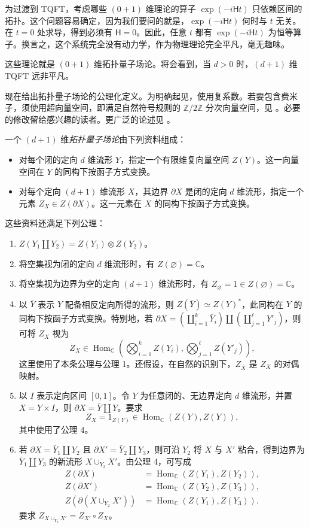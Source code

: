 为过渡到 TQFT，考虑哪些 $(0+1)$ 维理论的算子 $\exp(-i\mathsf Ht)$ 只依赖区间的拓扑。这个问题容易确定，因为我们要问的就是，$\exp(-i\mathsf Ht)$ 何时与 $t$ 无关。在 $t=0$ 处求导，得到必须有 $\mathsf H=0$。因此，任意 $t$ 都有 $\exp(-i\mathsf Ht)$ 为恒等算子。换言之，这个系统完全没有动力学，作为物理理论完全平凡，毫无趣味。

这些理论就是 $(0+1)$ 维拓扑量子场论。将会看到，当 $d>0$ 时，$(d+1)$ 维 TQFT 远非平凡。

现在给出拓扑量子场论的公理化定义。为明确起见，使用复系数。若要包含费米子，须使用超向量空间，即满足自然符号规则的 $\mathbb Z/2\mathbb Z$ 分次向量空间，见 。必要的修改留给感兴趣的读者。更广泛的论述见 。
\begin{definition}\label{def:topological-qft}
一个 $(d+1)$ 维\emph{拓扑量子场论}由下列资料组成：
\begin{itemize}
\item 对每个闭的定向 $d$ 维流形 $Y$，指定一个有限维复向量空间 $Z(Y)$。这一向量空间在 $Y$ 的同构下按函子方式变换。
\item 对每个定向 $(d+1)$ 维流形 $X$，其边界 $\partial X$ 是闭的定向 $d$ 维流形，指定一个元素 $Z_X\in Z(\partial X)$。这一元素在 $X$ 的同构下按函子方式变换。
\end{itemize}
这些资料还满足下列公理：
\begin{enumerate}[label=\textbf{公理 \arabic*：},leftmargin=4.7em]
\item $Z(Y_1\coprod Y_2)=Z(Y_1)\otimes Z(Y_2)$。
\item 将空集视为闭的定向 $d$ 维流形时，有 $Z(\varnothing)=\mathbb C$。
\item 将空集视为边界为空的定向 $(d+1)$ 维流形时，有 $Z_{\varnothing}=1\in Z(\varnothing)=\mathbb C$。
\item 以 $\bar Y$ 表示 $Y$ 配备相反定向所得的流形，则 $Z(\bar Y)\simeq Z(Y)^*$，此同构在 $Y$ 的同构下按函子方式变换。特别地，若 $\partial X=(\coprod_{i=1}^k\bar Y_i)\coprod(\coprod_{j=1}^{\ell}Y'_j)$，则可将 $Z_X$ 视为
\[
Z_X\in\operatorname{Hom}_{\mathbb C}
\left(\bigotimes_{i=1}^kZ(Y_i),\bigotimes_{j=1}^{\ell}Z(Y'_j)\right),
\]
这里使用了本条公理与公理 1。还假设，在自然的识别下，$Z_{\bar X}$ 是 $Z_X$ 的对偶映射。
\item 以 $I$ 表示定向区间 $[0,1]$。令 $Y$ 为任意闭的、无边界定向 $d$ 维流形，并置 $X=Y\times I$，则 $\partial X=\bar Y\coprod Y$。要求
\[
Z_X=1_{Z(Y)}\in\operatorname{Hom}_{\mathbb C}(Z(Y),Z(Y)),
\]
其中使用了公理 4。
\item 若 $\partial X=\bar Y_1\coprod Y_2$ 且 $\partial X'=\bar Y_2\coprod Y_3$，则可沿 $Y_2$ 将 $X$ 与 $X'$ 粘合，得到边界为 $\bar Y_1\coprod Y_3$ 的新流形 $X\cup_{Y_2}X'$。由公理 4，可写成
\[
\begin{aligned}
Z(\partial X)&=\operatorname{Hom}_{\mathbb C}(Z(Y_1),Z(Y_2)),\\
Z(\partial X')&=\operatorname{Hom}_{\mathbb C}(Z(Y_2),Z(Y_3)),\\
Z(\partial(X\cup_{Y_2}X'))&=\operatorname{Hom}_{\mathbb C}(Z(Y_1),Z(Y_3)).
\end{aligned}
\]
要求 $Z_{X\cup_{Y_2}X'}=Z_{X'}\circ Z_X$。
\end{enumerate}
\end{definition}
